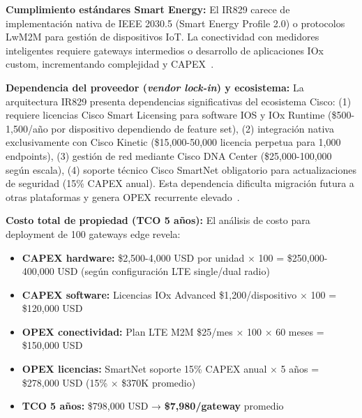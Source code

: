 \textbf{Cumplimiento estándares Smart Energy:} El IR829 carece de implementación nativa de IEEE 2030.5 (Smart Energy Profile 2.0) o protocolos LwM2M para gestión de dispositivos IoT. La conectividad con medidores inteligentes requiere gateways intermedios o desarrollo de aplicaciones IOx custom, incrementando complejidad y CAPEX~\cite{ciscoCiscoIndustrialRouters2024}.

\textbf{Dependencia del proveedor (\textit{vendor lock-in}) y ecosistema:} La arquitectura IR829 presenta dependencias significativas del ecosistema Cisco: (1) requiere licencias Cisco Smart Licensing para software IOS y IOx Runtime (\$500-1,500/año por dispositivo dependiendo de feature set), (2) integración nativa exclusivamente con Cisco Kinetic (\$15,000-50,000 licencia perpetua para 1,000 endpoints), (3) gestión de red mediante Cisco DNA Center (\$25,000-100,000 según escala), (4) soporte técnico Cisco SmartNet obligatorio para actualizaciones de seguridad (15\% CAPEX anual). Esta dependencia dificulta migración futura a otras plataformas y genera OPEX recurrente elevado~\cite{ciscoCiscoDNACenter2024}.

\textbf{Costo total de propiedad (TCO 5 años):} El análisis de costo para deployment de 100 gateways edge revela:

\begin{itemize}
\item \textbf{CAPEX hardware:} \$2,500-4,000 USD por unidad $\times$ 100 = \$250,000-400,000 USD (según configuración LTE single/dual radio)
\item \textbf{CAPEX software:} Licencias IOx Advanced \$1,200/dispositivo $\times$ 100 = \$120,000 USD
\item \textbf{OPEX conectividad:} Plan LTE M2M \$25/mes $\times$ 100 $\times$ 60 meses = \$150,000 USD
\item \textbf{OPEX licencias:} SmartNet soporte 15\% CAPEX anual $\times$ 5 años = \$278,000 USD (15\% $\times$ \$370K promedio)
\item \textbf{TCO 5 años:} \$798,000 USD → \textbf{\$7,980/gateway} promedio
\end{itemize}

